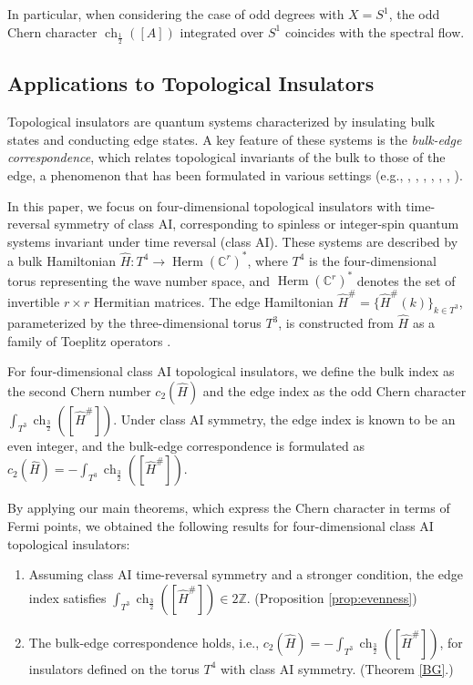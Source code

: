 \documentclass{amsart}
\theoremstyle{definition}
\theoremstyle{remark}
\begin{document}
In particular, when considering the case of odd degrees with \(X = S^1\), the odd Chern character \(\operatorname{ch}_{\frac{1}{2}}([A])\) integrated over \(S^1\) coincides with the spectral flow.


\medskip


\subsection{Applications to Topological Insulators}

Topological insulators are quantum systems characterized by insulating bulk states and conducting edge states. A key feature of these systems is the \emph{bulk-edge correspondence}, which relates topological invariants of the bulk to those of the edge, a phenomenon that has been formulated in various settings (e.g., \cite{Avila}, \cite{Avron}, \cite{Bellissard}, \cite{Braverman}, \cite{Guillemin}, \cite{Hatsugai}, \cite{Kellendonk00}).

In this paper, we focus on four-dimensional topological insulators with time-reversal symmetry of class AI, corresponding to spinless or integer-spin quantum systems invariant under time reversal (class AI). These systems are described by a bulk Hamiltonian $\hat{H} \colon T^4 \to \operatorname{Herm}(\mathbb{C}^r)^*$, where $T^4$ is the four-dimensional torus representing the wave number space, and $\operatorname{Herm}(\mathbb{C}^r)^*$ denotes the set of invertible $r \times r$ Hermitian matrices. The edge Hamiltonian $\hat{H}^{\#} = {\{\hat{H}^{\#}(k)\}}_{k \in T^3}$, parameterized by the three-dimensional torus $T^3$, is constructed from $\hat{H}$ as a family of Toeplitz operators \cite{Douglas}.

For four-dimensional class AI topological insulators, we define the bulk index as the second Chern number $c_2(\hat{H})$ and the edge index as the odd Chern character $\int_{T^3} \operatorname{ch}_{\frac{3}{2}}([\hat{H}^{\#}])$. Under class AI symmetry, the edge index is known to be an even integer, and the bulk-edge correspondence is formulated as $c_2(\hat{H}) = -\int_{T^3} \operatorname{ch}_{\frac{3}{2}}([\hat{H}^{\#}])$.

By applying our main theorems, which express the Chern character in terms of Fermi points, we obtained the following results for four-dimensional class AI topological insulators:
\begin{enumerate}
    \item Assuming class AI time-reversal symmetry and a stronger condition, the edge index satisfies $\int_{T^3} \operatorname{ch}_{\frac{3}{2}}([\hat{H}^{\#}]) \in 2\mathbb{Z}$. (Proposition \ref{prop:evenness})
    \item The bulk-edge correspondence holds, i.e., $c_2(\hat{H}) = -\int_{T^3} \operatorname{ch}_{\frac{3}{2}}([\hat{H}^{\#}])$, for insulators defined on the torus $T^4$ with class AI symmetry. (Theorem \ref{BG}.)
\end{enumerate}
\end{document}
